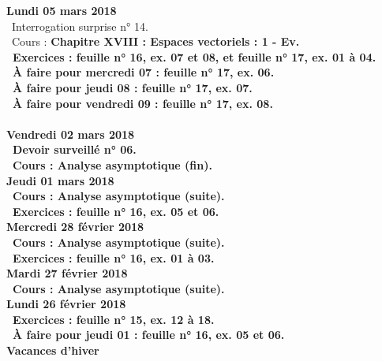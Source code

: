 \documentclass[12pt,a4paper]{article}
\begin{document}
\noindent\textbf{\bf Lundi 05 mars 2018} \\
\bu\ Interrogation surprise n° 14.\\
\bu\ Cours : \bf Chapitre XVIII \rm : Espaces vectoriels : 1 - Ev.\\
\bu\ Exercices : feuille n° 16, ex. 07 et 08, et feuille n° 17, ex. 01 à 04.\\
\bu\ À faire pour mercredi 07 : feuille n° 17, ex. 06.\\
\bu\ À faire pour jeudi 08 : feuille n° 17, ex. 07.\\
\bu\ À faire pour vendredi 09 : feuille n° 17, ex. 08.\vspace{.4cm}\\

\vspace{.4cm}\\ 

\noindent\textbf{Vendredi 02 mars 2018}\\
\bu\ Devoir surveillé n° 06.\\
\bu\ Cours : Analyse asymptotique (fin).\vspace{.4cm}\\

\noindent\textbf{Jeudi 01 mars 2018}\\
\bu\ Cours : Analyse asymptotique (suite).\\
\bu\ Exercices : feuille n° 16, ex. 05 et 06.\vspace{.4cm}\\

\noindent\textbf{Mercredi 28 février 2018} \\
\bu\ Cours : Analyse asymptotique (suite).\\
\bu\ Exercices : feuille n° 16, ex. 01 à 03.\vspace{.4cm}\\

\noindent\textbf{Mardi 27 février 2018} \\
\bu\ Cours : Analyse asymptotique (suite).\vspace{.4cm}\\

\noindent\textbf{\bf Lundi 26 février 2018} \\
\bu\ Exercices : feuille n° 15, ex. 12 à 18.\\
\bu\ À faire pour jeudi 01 : feuille n° 16, ex. 05 et 06.\vspace{.4cm}\\

\noindent\textbf{\bf Vacances d'hiver }\\
\end{document}
